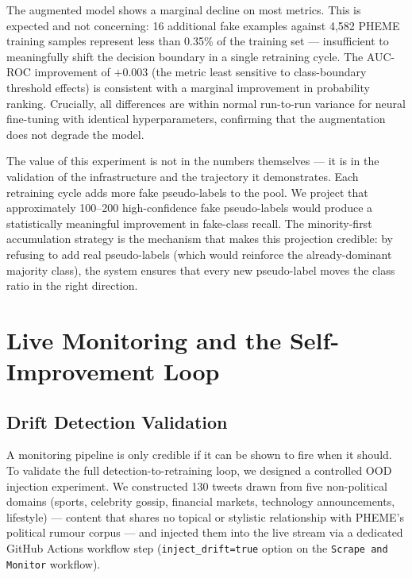 \documentclass[sigconf]{acmart}
\begin{document}
The augmented model shows a marginal decline on most metrics. This is expected and not
concerning: 16 additional fake examples against 4,582 PHEME training samples represent
less than 0.35\% of the training set — insufficient to meaningfully shift the decision
boundary in a single retraining cycle. The AUC-ROC improvement of $+0.003$ (the metric
least sensitive to class-boundary threshold effects) is consistent with a marginal improvement
in probability ranking. Crucially, all differences are within normal run-to-run variance
for neural fine-tuning with identical hyperparameters, confirming that the augmentation
does not degrade the model.

The value of this experiment is not in the numbers themselves — it is in the validation of
the infrastructure and the trajectory it demonstrates. Each retraining cycle adds more
fake pseudo-labels to the pool. We project that approximately 100--200 high-confidence fake
pseudo-labels would produce a statistically meaningful improvement in fake-class recall.
The minority-first accumulation strategy is the mechanism that makes this projection credible:
by refusing to add real pseudo-labels (which would reinforce the already-dominant majority
class), the system ensures that every new pseudo-label moves the class ratio in the right
direction.


\section{Live Monitoring and the Self-Improvement Loop}

\subsection{Drift Detection Validation}
\label{sec:drift_validation}

A monitoring pipeline is only credible if it can be shown to fire when it should. To validate
the full detection-to-retraining loop, we designed a controlled OOD injection experiment.
We constructed 130 tweets drawn from five non-political domains (sports, celebrity gossip,
financial markets, technology announcements, lifestyle) — content that shares no topical or
stylistic relationship with PHEME's political rumour corpus — and injected them into the
live stream via a dedicated GitHub Actions workflow step (\texttt{inject\_drift=true}
option on the \texttt{Scrape and Monitor} workflow).
\end{document}
